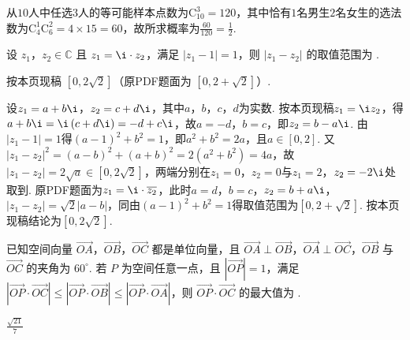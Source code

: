 \begin{solution}
从\(10\)人中任选\(3\)人的等可能样本点数为\(\mathrm C_{10}^3=120\)，其中恰有\(1\)名男生\(2\)名女生的选法数为\(\mathrm C_4^1\mathrm C_6^2=4\times 15=60\)，故所求概率为\(\frac{60}{120}=\frac12\).
\end{solution}

\begin{problem}
设 \(z_1\)，\(z_2\in \mathbb{C}\) 且 \(z_1=\i\cdot z_2\)，满足 \(\left|z_1-1\right|=1\)，则 \(\left|z_1-z_2\right|\) 的取值范围为\fillinblank{} .
\end{problem}

\begin{answer}
按本页现稿 \(\left[0,2\sqrt2\right]\)（原PDF题面为 \(\left[0,2+\sqrt2\right]\)）.
\end{answer}

\begin{solution}
设\(z_1=a+b\i\)，\(z_2=c+d\i\)，其中\(a\)，\(b\)，\(c\)，\(d\)为实数. 按本页现稿\(z_1=\i z_2\)，得\(a+b\i=\i\left(c+d\i\right)=-d+c\i\)，故\(a=-d\)，\(b=c\)，即\(z_2=b-a\i\). 由\(\left|z_1-1\right|=1\)得\(\left(a-1\right)^2+b^2=1\)，即\(a^2+b^2=2a\)，且\(a\in\left[0,2\right]\). 又\(\left|z_1-z_2\right|^2=\left(a-b\right)^2+\left(a+b\right)^2=2\left(a^2+b^2\right)=4a\)，故\(\left|z_1-z_2\right|=2\sqrt{a}\in\left[0,2\sqrt2\right]\)，两端分别在\(z_1=0\)，\(z_2=0\)与\(z_1=2\)，\(z_2=-2\i\)处取到. 原PDF题面为\(z_1=\i\cdot\overline{z_2}\)，此时\(a=d\)，\(b=c\)，\(z_2=b+a\i\)，\(\left|z_1-z_2\right|=\sqrt{2}\left|a-b\right|\)，同由\(\left(a-1\right)^2+b^2=1\)得取值范围为\(\left[0,2+\sqrt2\right]\). 按本页现稿结论为\(\left[0,2\sqrt2\right]\).
\end{solution}

\begin{problem}
已知空间向量 \(\overrightarrow{OA}\)，\(\overrightarrow{OB}\)，\(\overrightarrow{OC}\) 都是单位向量，且 \(\overrightarrow{OA}\perp \overrightarrow{OB}\)，\(\overrightarrow{OA}\perp \overrightarrow{OC}\)，\(\overrightarrow{OB}\) 与 \(\overrightarrow{OC}\) 的夹角为 \(60^\circ\). 若 \(P\) 为空间任意一点，且 \(\left|\overrightarrow{OP}\right|=1\)，满足 \(\left|\overrightarrow{OP}\cdot\overrightarrow{OC}\right|\le \left|\overrightarrow{OP}\cdot\overrightarrow{OB}\right|\le \left|\overrightarrow{OP}\cdot\overrightarrow{OA}\right|\)，则 \(\overrightarrow{OP}\cdot\overrightarrow{OC}\) 的最大值为\fillinblank{} .
\end{problem}

\begin{answer}
\(\frac{\sqrt{21}}{7}\)
\end{answer}

